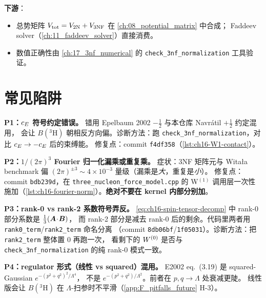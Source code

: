 \textbf{下游}：
\begin{itemize}
  \item 总势矩阵 \(V_{\rm tot} = V_{\rm 2N} + V_{\rm 3NF}\) 在 \cref{ch:08_potential_matrix} 中合成；
        Faddeev solver（\cref{ch:11_faddeev_solver}）直接消费。
  \item 数值正确性由 \cref{ch:17_3nf_numerical} 的 \texttt{check\_3nf\_normalization} 工具验证。
\end{itemize}

\section{常见陷阱}
\label{sec:ch16-pitfalls}

\begin{pitfallbox}
\textbf{P1：\(c_E\) 符号约定错误。}
错用 Epelbaum 2002 \(-\tfrac12\) 与本仓库 Navrátil \(+\tfrac12\) 约定混用，
会让 \(B(^3\mathrm{H})\) 朝相反方向偏。诊断方法：跑 \texttt{check\_3nf\_normalization}，对比 \(c_E\to-c_E\) 后的束缚能。
修复点：commit \texttt{f4df358}（\cref{lst:ch16-W1-contact}）。
\end{pitfallbox}

\begin{pitfallbox}
\textbf{P2：\(1/(2\pi)^3\) Fourier 归一化漏乘或重复乘。}
症状：3NF 矩阵元与 Witała benchmark 偏 \((2\pi)^{\pm 3}\sim 4\times 10^{-3}\) 量级（漏乘是\textit{大}，重复是\textit{小}）。
修复点：commit \texttt{bdb239d}，在 \texttt{three\_nucleon\_force\_model.cpp} 的
W\(^{(1)}\) 调用层一次性施加（\cref{lst:ch16-fourier-norm}）。\textbf{绝对不要在 kernel 内部分别加}。
\end{pitfallbox}

\begin{pitfallbox}
\textbf{P3：rank-0 vs rank-2 系数符号弄反。}
\cref{eq:ch16-spin-tensor-decomp} 中 rank-0 部分系数是 \(\tfrac{1}{3}(\bm{A}\!\cdot\!\bm{B})\)，
而 rank-2 部分是减去 rank-0 后的剩余。代码里两者用 \texttt{rank0\_term}/\texttt{rank2\_term} 命名分离
（commit \texttt{8db06bf}/\texttt{1f05031}）。诊断方法：把 \texttt{rank2\_term} 整体置 0 再跑一次，
看剩下的 \(W^{(0)}\) 是否与 \texttt{check\_3nf\_normalization} 的纯 rank-0 模式一致。
\end{pitfallbox}

\begin{pitfallbox}
\textbf{P4：regulator 形式（线性 vs squared）混用。}
E2002 eq.~(3.19) 是 squared-Gaussian \(e^{-(p^2+q^2)^2/\Lambda^4}\)，
不是 \(e^{-(p^2+q^2)/\Lambda^2}\)。前者在 \(p,q\to\Lambda\) 处衰减更陡。
线性版会让 \(B(^3\mathrm{H})\) 在 \(\Lambda\)-扫参时不平滑（\cref{app:F_pitfalls_future} H-3）。
\end{pitfallbox}

